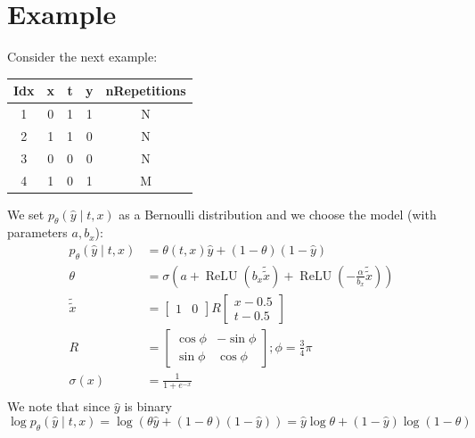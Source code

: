 \documentclass[oneside,12pt]{article}
\begin{document}
\section*{Example}\label{sec:example}
Consider the next example:
\begin{center}
 \begin{tabular}{||c | c | c | c | c||}
 \hline
 Idx & x & t & y & nRepetitions \\ [0.5ex] 
 \hline\hline
 1 & 0 & 1 & 1 & N \\ 
 \hline
 2 & 1 & 1 & 0 & N \\
 \hline
 3 & 0 & 0 & 0 & N \\
 \hline
 4 & 1 & 0 & 1 & M \\ [1ex] 
 \hline
\end{tabular}
\end{center}
We set $p_\theta(\hat{y} \mid t,x)$ as a Bernoulli distribution and we choose the model (with parameters $a,b_x$):
\begin{equation}
    \begin{split}
        p_\theta(\hat{y} \mid t,x) &= \theta(t,x)\hat{y} + (1-\theta)(1-\hat{y})\\
        \theta &= \sigma(a+\operatorname{ReLU}(b_x\tilde{\tilde{x}}) + \operatorname{ReLU}(-\frac{\alpha}{b_x}\tilde{\tilde{x}}))\\
        \tilde{\tilde{x}} &= \begin{bmatrix} 1 & 0 \end{bmatrix} R \begin{bmatrix} x-0.5 \\ t-0.5 \end{bmatrix}\\
        R &= \begin{bmatrix} \operatorname{cos}\phi & -\operatorname{sin}\phi \\ \operatorname{sin}\phi & \operatorname{cos}\phi \end{bmatrix}; \phi = \frac{3}{4}\pi\\
        \sigma(x) &= \frac{1}{1+e^{-x}}\\
    \end{split}
\end{equation}
%
We note that since $\hat{y}$ is binary
\begin{equation}
    \operatorname{log}p_\theta(\hat{y} \mid t,x) = \operatorname{log}\left(\theta\hat{y} + (1-\theta)(1-\hat{y})\right) = \hat{y}\operatorname{log}\theta + (1-\hat{y})\operatorname{log}(1-\theta)
\end{equation}
\end{document}

